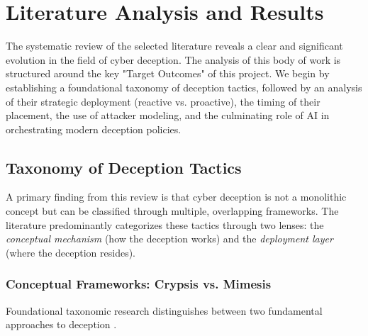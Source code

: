 \section{Literature Analysis and Results} \label{sec:literature_and_results}

The systematic review of the selected literature reveals a clear and significant evolution in the field of cyber deception.
The analysis of this body of work is structured around the key "Target Outcomes" of this project.
We begin by establishing a foundational taxonomy of deception tactics, followed by an analysis of their strategic
deployment (reactive vs. proactive), the timing of their placement, the use of attacker modeling, and the culminating
role of AI in orchestrating modern deception policies.

\subsection{Taxonomy of Deception Tactics}

A primary finding from this review is that cyber deception is not a monolithic concept but can be classified through multiple,
overlapping frameworks. The literature predominantly categorizes these tactics through two lenses: the
\textit{conceptual mechanism} (how the deception works) and the \textit{deployment layer} (where the deception resides).

\subsubsection{Conceptual Frameworks: Crypsis vs. Mimesis}

Foundational taxonomic research distinguishes between two fundamental approaches to deception \cite{pawlick2019game}.

